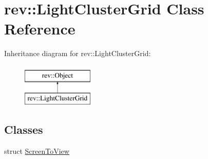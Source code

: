 \hypertarget{classrev_1_1_light_cluster_grid}{}\section{rev\+::Light\+Cluster\+Grid Class Reference}
\label{classrev_1_1_light_cluster_grid}
Inheritance diagram for rev\+::Light\+Cluster\+Grid\+:\begin{figure}[H]
\begin{center}
\leavevmode
\includegraphics[height=2.000000cm]{classrev_1_1_light_cluster_grid}
\end{center}
\end{figure}
\subsection*{Classes}
\begin{DoxyCompactItemize}
\item 
struct \mbox{\hyperlink{structrev_1_1_light_cluster_grid_1_1_screen_to_view}{Screen\+To\+View}}
\end{DoxyCompactItemize}
